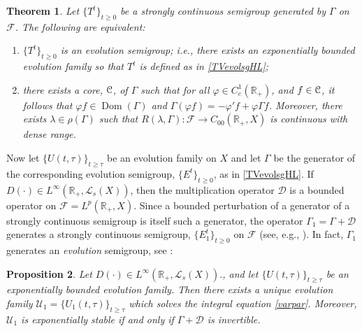 \documentclass[10pt,psamsfonts,leqno]{siamltex}
\newtheorem{prop}{Proposition}[section]
\newtheorem{thm}[prop]{Theorem}
\newcommand{\bbR}{\mathbb{R}}
\newcommand{\scrC}{\EuScript{C}}
\newcommand{\Dom}{\operatorname{Dom}}
\newcommand{\vphi}{\varphi}
\newcommand{\lb}{\label}
\newcommand{\Coo}{{C_{00}(\bbR_+,X)}}
\newcommand{\Uone}{\mathcal{U}_1}
\begin{document}
\begin{thm}\lb{RRS-evsgThm}
Let $\{T^t\}_{t\ge0}$ be a strongly continuous semigroup generated by
$\Gamma$ on $\mathcal{F}$.  The
following are equivalent:
\begin{enumerate}
\item $\{T^t\}_{t\ge0}$ is an evolution semigroup;  i.e.,
there exists an exponentially bounded evolution family so that $T^t$ is
defined as in \eqref{TVevolsgHL};
\item there exists a core, $\scrC$, of $\Gamma$ such that for all
$\vphi\in C_c^1(\bbR_+)$, and $f\in\scrC$, it follows that $\vphi f\in
\Dom(\Gamma)$ and $\Gamma(\vphi f)=-\vphi'f+\vphi\Gamma f$.  Moreover,
there exists $\lambda\in\rho(\Gamma)$ such that
$R(\lambda,\Gamma): \mathcal{F}\to \Coo$ is continuous with dense range.
\end{enumerate}
\end{thm}

Now let $\{U(t,\tau)\}_{t\ge \tau}$ be an evolution family on $X$ and
let
$\Gamma$ be the generator of the corresponding evolution semigroup,
$\{E^t\}_{t\ge0}$, as in \eqref{TVevolsgHL}.
If $D(\cdot)\in L^\infty(\bbR_+,\mathcal{L}_s(X))$, then the
multiplication operator $\mathcal{D}$ is a bounded operator
 on $\mathcal{F}=L^p(\bbR_+,X)$. Since a bounded perturbation of a
generator of a strongly continuous semigroup is itself such a generator,
the operator $\Gamma_1=\Gamma+\mathcal{D}$ generates a strongly
continuous semigroup, $\{E_1^t\}_{t\ge0}$ on
$\mathcal{F}$ (see, e.g., \cite{Pazy}). In fact, $\Gamma_1$ generates
an {\em evolution} semigroup, see \cite{RRS,RolandDis}:

\begin{prop}\lb{GammaRobustStab} Let $D(\cdot)\in
L^\infty(\bbR_+,\mathcal{L}_s(X)).$, and let $\{U(t,\tau)\}_{t\ge \tau}$
be an
exponentially bounded evolution family.   Then there exists a unique
evolution family $\Uone=\{U_1(t,\tau)\}_{t\ge
\tau}$ which solves the integral equation \eqref{varpar}.  Moreover,
$\Uone$ is exponentially stable if and only if $\Gamma+\mathcal{D}$ is
invertible.
\end{prop}
\end{document}
